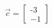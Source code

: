 \documentclass[preview]{standalone}
\begin{document}
\begin{align*}
\vec{c} = \begin{bmatrix} \text{-}3 \\ -1 \end{bmatrix}
\end{align*}
\end{document}
